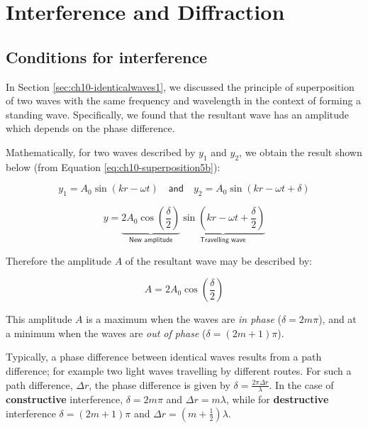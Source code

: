 \documentclass[
]{book}
\begin{document}
\hypertarget{sec:ch13-interference}{%
\chapter{Interference and Diffraction}\label{sec:ch13-interference}}

\hypertarget{sec:ch13-conditionsinterference}{%
\section{Conditions for interference}\label{sec:ch13-conditionsinterference}}

In Section \ref{sec:ch10-identicalwaves1}, we discussed the principle of superposition of two waves with the same frequency and wavelength in the context of forming a standing wave. Specifically, we found that the resultant wave has an amplitude which depends on the phase difference.

Mathematically, for two waves described by \(y_1\) and \(y_2\), we obtain the result shown below (from Equation \eqref{eq:ch10-superposition5b}):

\begin{equation}
y_1 = A_0 \sin(k r - \omega t) \quad \textsf{and} \quad y_2 = A_0 \sin(k r - \omega t + \delta)
\end{equation}

\begin{equation}
y = \underbrace{2 A_0 \cos \left( \frac{\delta}{2} \right)}_{\textsf{New amplitude}} \underbrace{\sin \left( kr - \omega t + \frac{\delta}{2} \right)}_{\textsf{Travelling wave}}
\end{equation}

Therefore the amplitude \(A\) of the resultant wave may be described by:

\begin{equation}
A = 2 A_0 \cos \left( \frac{\delta}{2} \right)
\label{eq:ch13-amplitudeinterfere1}
\end{equation}

This amplitude \(A\) is a maximum when the waves are \emph{in phase} (\(\delta = 2m\pi\)), and at a minimum when the waves are \emph{out of phase} (\(\delta = (2m+1)\pi\)).

Typically, a phase difference between identical waves results from a path difference; for example two light waves travelling by different routes. For such a path difference, \(\Delta r\), the phase difference is given by \(\delta = \frac{2 \pi \Delta r}{\lambda}\). In the case of \textbf{constructive} interference, \(\delta = 2m\pi\) and \(\Delta r = m\lambda\), while for \textbf{destructive} interference \(\delta = (2m+1)\pi\) and \(\Delta r = \left(m+\frac{1}{2}\right)\lambda\).
\end{document}
